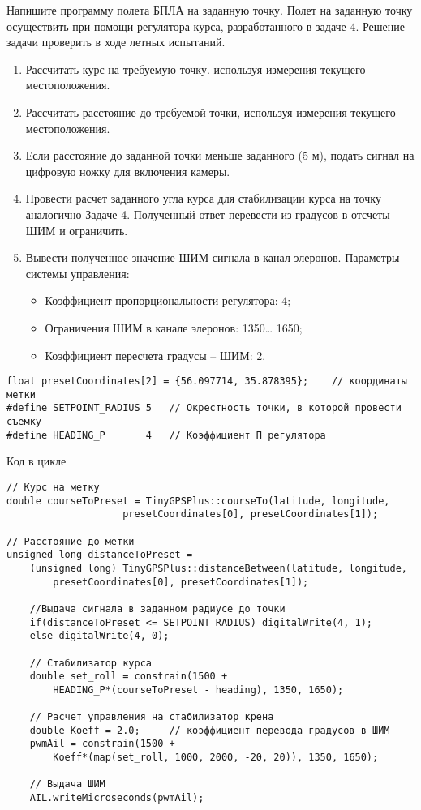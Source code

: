
Напишите программу полета БПЛА на заданную точку. Полет на заданную точку осуществить при помощи регулятора курса, разработанного в задаче 4. Решение задачи проверить в ходе летных испытаний.

\solutionSection
\begin{enumerate}
    \item Рассчитать курс на требуемую точку. используя измерения текущего местоположения.     
    \item  Рассчитать расстояние до требуемой точки, используя измерения текущего местоположения.
    \item  Если расстояние до заданной точки меньше заданного (5 м), подать сигнал на цифровую ножку для включения камеры.
    \item  Провести расчет заданного угла курса для стабилизации курса на точку аналогично Задаче 4. Полученный ответ перевести из градусов в отсчеты ШИМ и ограничить.
    \item Вывести полученное значение ШИМ сигнала в канал элеронов. 
    Параметры системы управления:
    \begin{itemize}
        \item	Коэффициент пропорциональности регулятора: 4;
        \item	Ограничения ШИМ в канале элеронов: 1350… 1650;
        \item	Коэффициент пересчета градусы – ШИМ: 2.
    \end{itemize}
\end{enumerate}


\begin{verbatim}
float presetCoordinates[2] = {56.097714, 35.878395};	// координаты метки
#define SETPOINT_RADIUS 5	// Окрестность точки, в которой провести съемку
#define HEADING_P       4	// Коэффициент П регулятора
\end{verbatim}
Код в цикле
\begin{verbatim}
// Курс на метку
double courseToPreset = TinyGPSPlus::courseTo(latitude, longitude, 
					presetCoordinates[0], presetCoordinates[1]);

// Расстояние до метки
unsigned long distanceToPreset = 
	(unsigned long) TinyGPSPlus::distanceBetween(latitude, longitude, 
		presetCoordinates[0], presetCoordinates[1]);
		
	//Выдача сигнала в заданном радиусе до точки
	if(distanceToPreset <= SETPOINT_RADIUS) digitalWrite(4, 1);
	else digitalWrite(4, 0);

	// Стабилизатор курса
	double set_roll = constrain(1500 + 
		HEADING_P*(courseToPreset - heading), 1350, 1650);

	// Расчет управления на стабилизатор крена
	double Koeff = 2.0;		// коэффициент перевода градусов в ШИМ
	pwmAil = constrain(1500 + 
		Koeff*(map(set_roll, 1000, 2000, -20, 20)), 1350, 1650);

	// Выдача ШИМ
	AIL.writeMicroseconds(pwmAil);

\end{verbatim}

